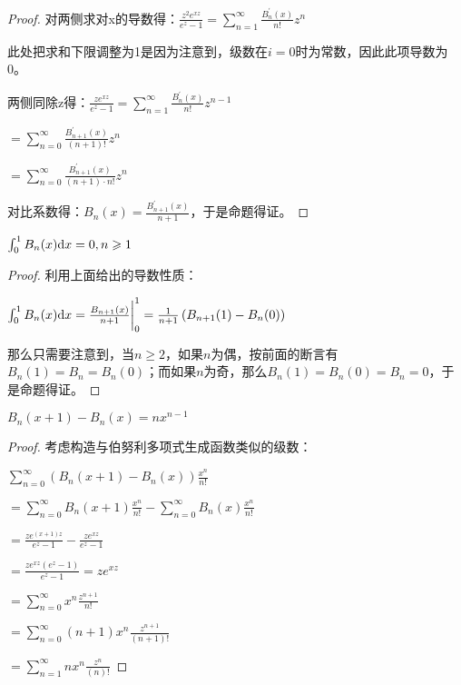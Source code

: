 \documentclass[12pt, a4paper, oneside, UTF8]{ctexbook}
\begin{document}
\begin{para}{0}
\begin{para}{1}
\begin{proof}
						对两侧求对x的导数得：$\frac{z^2 e^{xz}}{e^z-1} = \sum\limits_{n=1}^{\infty} \frac{B_n^{\prime}(x)}{n!}z^n$
						
						此处把求和下限调整为1是因为注意到，级数在$i=0$时为常数，因此此项导数为0。
						
						两侧同除z得：$\frac{z e^{xz}}{e^z-1} = \sum\limits_{n=1}^{\infty} \frac{B_n^{\prime}(x)}{n!}z^{n-1}$
						
						$=\sum\limits_{n=0}^{\infty} \frac{B_{n+1}^{\prime}(x)}{(n+1)!}z^{n}$
						
						$=\sum\limits_{n=0}^{\infty} \frac{B_{n+1}^{\prime}(x)}{(n+1)\cdot n!}z^{n}$
						
						对比系数得：$B_n(x) = \frac{B_{n+1}^{\prime}(x)}{n+1}$，于是命题得证。
					\end{proof}
				\point{}
					\begin{proposition}
						$\int_{0}^{1} B_n (x) \mathrm{d} x = 0 ,n \geqslant 1$
					\end{proposition}
					\begin{proof}
						利用上面给出的导数性质：
						
						$\int_{0}^{1} B_n (x) \mathrm{d} x = \frac{B_{n+1}(x)}{n+1} \bigg|_{0}^{1} = \frac{1}{n+1}\left(B_{n+1}(1)-B_n(0)\right)$
						
						那么只需要注意到，当$n\geqslant 2$，如果$n$为偶，按前面的断言有$B_n(1)=B_n=B_n(0)$；而如果$n$为奇，那么$B_n(1) = B_n(0) = B_n = 0$，于是命题得证。
					\end{proof}
				\point{}
					\begin{proposition}
						$B_n (x+1)-B_n (x) = nx^{n-1}$
					\end{proposition}
					\begin{proof}
						考虑构造与伯努利多项式生成函数类似的级数：
						
						$\sum\limits_{n=0}^{\infty} \left(B_n(x+1)-B_n(x)\right) \frac{x^n}{n!}$
						
						$=\sum\limits_{n=0}^{\infty} B_n(x+1) \frac{x^n}{n!}-\sum\limits_{n=0}^{\infty} B_n(x) \frac{x^n}{n!}$
						
						$=\frac{z e^{(x+1)z}}{e^z-1}-\frac{z e^{xz}}{e^z-1}$
						
						$=\frac{z e^{xz} (e^z-1)}{e^z-1} = z e^{xz}$
						
						$=\sum\limits_{n=0}^{\infty} x^n \frac{z^{n+1}}{n!}$
						
						$=\sum\limits_{n=0}^{\infty} (n+1)x^n \frac{z^{n+1}}{(n+1)!}$
						
						$=\sum\limits_{n=1}^{\infty} n x^n \frac{z^{n}}{(n)!}$
						

\end{proof}
\end{para}
\end{para}
\end{document}
